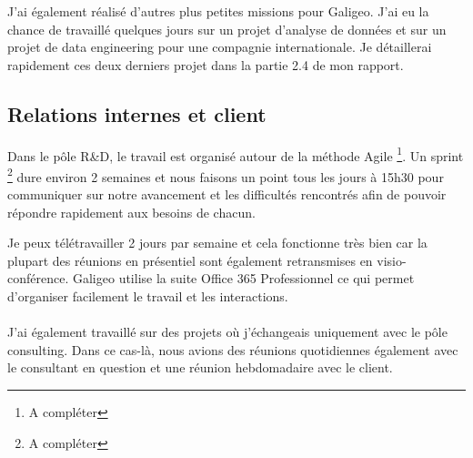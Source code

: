 J’ai également réalisé d’autres plus petites missions pour Galigeo. J’ai eu la chance de travaillé quelques jours sur un projet d’analyse de données et sur un projet de data engineering pour une compagnie internationale. Je détaillerai rapidement ces deux derniers projet dans la partie 2.4 de mon rapport.


\subsection{Relations internes et client}

Dans le pôle R\&D, le travail est organisé autour de la méthode Agile \footnote{A compléter}. Un sprint \footnote{A compléter} dure environ 2 semaines et nous faisons un point tous les jours à 15h30 pour communiquer sur notre avancement et les difficultés rencontrés afin de pouvoir répondre rapidement aux besoins de chacun.

Je peux télétravailler 2 jours par semaine et cela fonctionne très bien car la plupart des réunions en présentiel sont également retransmises en visio-conférence. Galigeo utilise la suite Office 365 Professionnel ce qui permet d’organiser facilement le travail et les interactions.

\paragraph*{}

J’ai également travaillé sur des projets où j’échangeais uniquement avec le pôle consulting. Dans ce cas-là, nous avions des réunions quotidiennes également avec le consultant en question et une réunion hebdomadaire avec le client.
